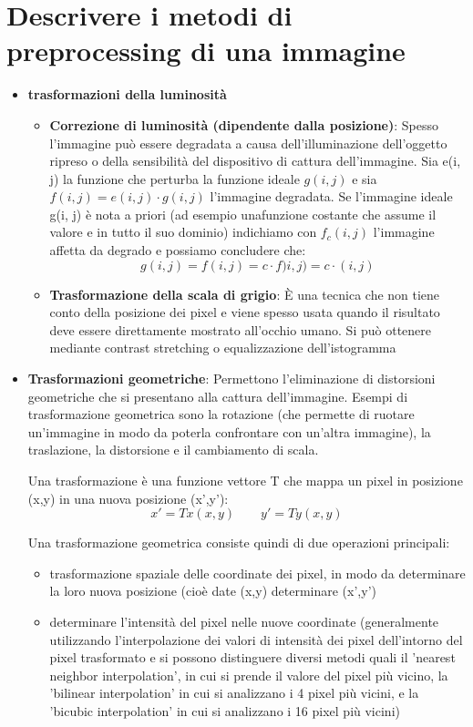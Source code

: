 \section{Descrivere i metodi di preprocessing di una immagine}
\begin{itemize}
	\item \textbf{trasformazioni della luminosità}
	\begin{itemize}
		\item \textbf{Correzione di luminosità (dipendente dalla posizione)}: Spesso l'immagine può essere degradata a causa dell'illuminazione dell'oggetto ripreso o della sensibilità del dispositivo di cattura dell'immagine.
		Sia e(i, j) la funzione che perturba la funzione ideale $g(i, j)$ e sia $f (i, j) = e(i, j) \cdotp g(i, j)$ l'immagine degradata. Se l'immagine ideale g(i, j) è nota a priori (ad esempio unafunzione costante che assume il valore e in tutto il suo dominio) indichiamo con $f_c (i, j)$ l'immagine affetta da degrado e possiamo concludere che:
		$$
		g(i,j) = f(i,j)= c \cdotp f)i,j)= c \cdotp (i,j)
		$$
		
		\item \textbf{Trasformazione della scala di grigio}: È una tecnica che non tiene conto della posizione dei pixel e viene spesso usata quando il risultato deve essere direttamente mostrato all'occhio umano. Si può ottenere mediante contrast stretching o equalizzazione dell'istogramma
	\end{itemize}
	
	\item \textbf{Trasformazioni geometriche}: Permettono l'eliminazione di distorsioni geometriche che si presentano alla cattura dell'immagine. Esempi di trasformazione geometrica sono la rotazione (che permette di ruotare un'immagine in modo da poterla confrontare con un'altra immagine), la traslazione, la distorsione e il cambiamento di scala.
	
	Una trasformazione è una funzione vettore T che mappa un pixel in posizione (x,y) in una nuova posizione (x',y'):
	$$
	x' = Tx(x,y) \qquad y'= Ty(x,y)
	$$
	
	Una trasformazione geometrica consiste quindi di due operazioni principali:
	\begin{itemize}
		\item trasformazione spaziale delle coordinate dei pixel, in modo da determinare la loro nuova posizione (cioè date (x,y) determinare (x',y')
		\item determinare l'intensità del pixel nelle nuove coordinate (generalmente utilizzando l'interpolazione dei valori di intensità dei pixel dell'intorno del pixel trasformato e si possono distinguere diversi metodi quali il 'nearest neighbor interpolation', in cui si prende	il valore del pixel più vicino, la 'bilinear interpolation' in cui si analizzano i 4 pixel più vicini, e la 'bicubic interpolation' in cui si analizzano i 16 pixel più vicini)
	\end{itemize}
	

\end{itemize}
